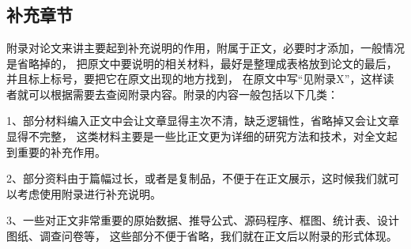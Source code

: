 
\chapter{}



\section{补充章节}

附录对论文来讲主要起到补充说明的作用，附属于正文，必要时才添加，一般情况是省略掉的，
把原文中要说明的相关材料，最好是整理成表格放到论文的最后，并且标上标号，要把它在原文出现的地方找到，
在原文中写“见附录X”，这样读者就可以根据需要去查阅附录内容。附录的内容一般包括以下几类：

1、部分材料编入正文中会让文章显得主次不清，缺乏逻辑性，省略掉又会让文章显得不完整，
这类材料主要是一些比正文更为详细的研究方法和技术，对全文起到重要的补充作用。

2、部分资料由于篇幅过长，或者是复制品，不便于在正文展示，这时候我们就可以考虑使用附录进行补充说明。

3、一些对正文非常重要的原始数据、推导公式、源码程序、框图、统计表、设计图纸、调查问卷等，
这些部分不便于省略，我们就在正文后以附录的形式体现。

